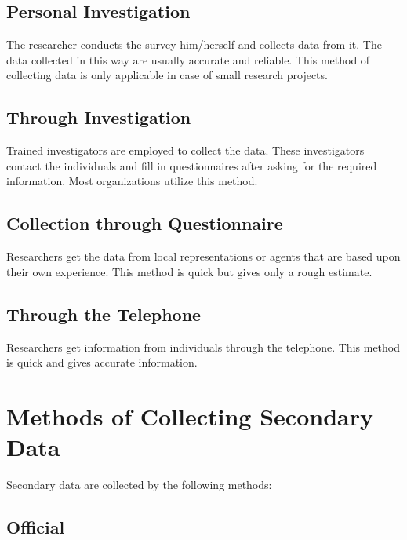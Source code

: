 \documentclass[
]{book}
\begin{document}
\hypertarget{personal-investigation}{%
\subsection{Personal Investigation}\label{personal-investigation}}

The researcher conducts the survey him/herself and collects data from
it. The data collected in this way are usually accurate and reliable.
This method of collecting data is only applicable in case of small
research projects.

\hypertarget{through-investigation}{%
\subsection{Through Investigation}\label{through-investigation}}

Trained investigators are employed to collect the data. These
investigators contact the individuals and fill in questionnaires after
asking for the required information. Most organizations utilize this
method.

\hypertarget{collection-through-questionnaire}{%
\subsection{Collection through Questionnaire}\label{collection-through-questionnaire}}

Researchers get the data from local representations or agents that are
based upon their own experience. This method is quick but gives only a
rough estimate.

\hypertarget{through-the-telephone}{%
\subsection{Through the Telephone}\label{through-the-telephone}}

Researchers get information from individuals through the telephone. This
method is quick and gives accurate information.

\hypertarget{methods-of-collecting-secondary-data}{%
\section{Methods of Collecting Secondary Data}\label{methods-of-collecting-secondary-data}}

Secondary data are collected by the following methods:

\hypertarget{official}{%
\subsection{Official}\label{official}}
\end{document}
